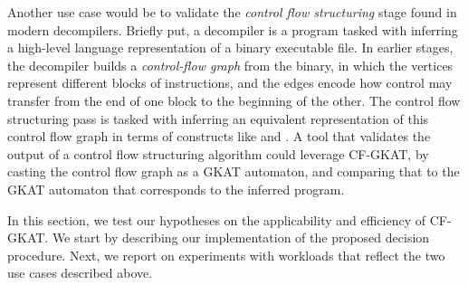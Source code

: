 Another use case would be to validate the \emph{control flow structuring} stage found in modern decompilers.
Briefly put, a decompiler is a program tasked with inferring a high-level language representation of a binary executable file.
In earlier stages, the decompiler builds a \emph{control-flow graph} from the binary, in which the vertices represent different blocks of instructions, and the edges encode how control may transfer from the end of one block to the beginning of the other.
The control flow structuring pass is tasked with inferring an equivalent representation of this control flow graph in terms of constructs like  and .
A tool that validates the output of a control flow structuring algorithm could leverage CF-GKAT, by casting the control flow graph as a GKAT automaton, and comparing that to the GKAT automaton that corresponds to the inferred program.

In this section, we test our hypotheses on the applicability and efficiency of CF-GKAT\@.
We start by describing our implementation of the proposed decision procedure.
Next, we report on experiments with workloads that reflect the two use cases described above.
